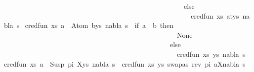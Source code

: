 \begin{isabellebody}
\ \ \ \ \ \ \ \ \ \ \ \ \ \ \ \ \ \ \ \ \ \ \ \ \ \ \ \ \ \ \ \ \ \ \ \ \ \ \ \ \ \ \ \ \ \ \ \ \ \ \ \ else\isanewline
\ \ \ \ \ \ \ \ \ \ \ \ \ \ \ \ \ \ \ \ \ \ \ \ \ \ \ \ \ \ \ \ \ \ \ \ \ \ \ \ \ \ \ \ \ \ \ \ \ \ \ \ \ \ cred{\isacharunderscore}{\kern0pt}fun\ {\isacharparenleft}{\kern0pt}{\isacharparenleft}{\kern0pt}xs{\isacharcomma}{\kern0pt}\ {\isacharparenleft}{\kern0pt}a{\isasymsharp}{\isacharquery}{\kern0pt}t{\isacharparenright}{\kern0pt}{\isacharhash}{\kern0pt}ys{\isacharparenright}{\kern0pt}{\isacharcomma}{\kern0pt}\ nabla{\isacharcomma}{\kern0pt}\ s{\isacharparenright}{\kern0pt}{\isacharparenright}{\kern0pt}{\isachardoublequoteclose}\ {\isacharbar}{\kern0pt}\isanewline
{\isachardoublequoteopen}cred{\isacharunderscore}{\kern0pt}fun\ {\isacharparenleft}{\kern0pt}{\isacharparenleft}{\kern0pt}xs{\isacharcomma}{\kern0pt}\ {\isacharparenleft}{\kern0pt}a\ {\isasymsharp}{\isacharquery}{\kern0pt}\ Atom\ b{\isacharparenright}{\kern0pt}{\isacharhash}{\kern0pt}ys{\isacharparenright}{\kern0pt}{\isacharcomma}{\kern0pt}\ nabla{\isacharcomma}{\kern0pt}\ s{\isacharparenright}{\kern0pt}\ {\isacharequal}{\kern0pt}\ {\isacharparenleft}{\kern0pt}if\ a\ {\isacharequal}{\kern0pt}\ b\ then\isanewline
\ \ \ \ \ \ \ \ \ \ \ \ \ \ \ \ \ \ \ \ \ \ \ \ \ \ \ \ \ \ \ \ \ \ \ \ \ \ \ \ \ \ \ \ \ \ \ \ \ \ None\isanewline
\ \ \ \ \ \ \ \ \ \ \ \ \ \ \ \ \ \ \ \ \ \ \ \ \ \ \ \ \ \ \ \ \ \ \ \ \ \ \ \ \ \ \ \ \ \ \ \ else\isanewline
\ \ \ \ \ \ \ \ \ \ \ \ \ \ \ \ \ \ \ \ \ \ \ \ \ \ \ \ \ \ \ \ \ \ \ \ \ \ \ \ \ \ \ \ \ \ \ \ \ \ cred{\isacharunderscore}{\kern0pt}fun\ {\isacharparenleft}{\kern0pt}{\isacharparenleft}{\kern0pt}xs{\isacharcomma}{\kern0pt}\ ys{\isacharparenright}{\kern0pt}{\isacharcomma}{\kern0pt}\ nabla{\isacharcomma}{\kern0pt}\ s{\isacharparenright}{\kern0pt}{\isacharparenright}{\kern0pt}{\isachardoublequoteclose}\ {\isacharbar}{\kern0pt}\isanewline
{\isachardoublequoteopen}cred{\isacharunderscore}{\kern0pt}fun\ {\isacharparenleft}{\kern0pt}{\isacharparenleft}{\kern0pt}xs{\isacharcomma}{\kern0pt}\ {\isacharparenleft}{\kern0pt}a\ {\isasymsharp}{\isacharquery}{\kern0pt}\ Susp\ pi\ X{\isacharparenright}{\kern0pt}{\isacharhash}{\kern0pt}ys{\isacharparenright}{\kern0pt}{\isacharcomma}{\kern0pt}\ nabla{\isacharcomma}{\kern0pt}\ s{\isacharparenright}{\kern0pt}\ {\isacharequal}{\kern0pt}\ cred{\isacharunderscore}{\kern0pt}fun\ {\isacharparenleft}{\kern0pt}{\isacharparenleft}{\kern0pt}xs{\isacharcomma}{\kern0pt}\ ys{\isacharparenright}{\kern0pt}{\isacharcomma}{\kern0pt}\ {\isacharbraceleft}{\kern0pt}{\isacharparenleft}{\kern0pt}{\isacharparenleft}{\kern0pt}swapas\ {\isacharparenleft}{\kern0pt}rev\ pi{\isacharparenright}{\kern0pt}\ a{\isacharparenright}{\kern0pt}{\isacharcomma}{\kern0pt}X{\isacharparenright}{\kern0pt}{\isacharbraceright}{\kern0pt}{\isasymunion}nabla{\isacharcomma}{\kern0pt}\ s{\isacharparenright}{\kern0pt}{\isachardoublequoteclose}\ {\isacharbar}{\kern0pt}\isanewline

\end{isabellebody}
